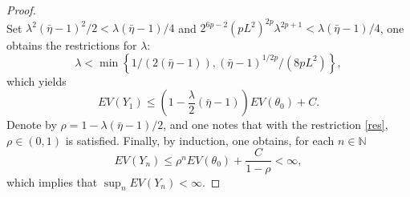 \documentclass[a4paper]{article}
\begin{document}
\begin{proof}
\[\]
Set $\lambda^2(\bar{\eta} -1)^2/2<\lambda (\bar{\eta} -1)/4$ and $2^{6p-2}( pL^2)^{2p}\lambda^{2p+1} <\lambda (\bar{\eta} -1)/4$, one obtains the restrictions for $\lambda$:
\begin{equation}\label{res}
\lambda < \min\left\{1/(2(\bar{\eta} -1)), (\bar{\eta}-1)^{1/2p}/(8pL^2)\right\},
\end{equation}
which yields
\[
E V(Y_1)  \leq \left(1-\frac{\lambda }{2}(\bar{\eta} -1)\right) E V(\theta_0) + C.
\]
Denote by $\rho = 1-\lambda (\bar{\eta} -1)/2$, and one notes that with the restriction \eqref{res}, $\rho \in (0,1)$ is satisfied. Finally, by induction, one obtains, for each $n \in \mathbb{N}$
\[
E V(Y_n) \leq \rho^n E V(\theta_0) + \frac{C}{1-\rho} <\infty,
\]
which implies that $\sup_n EV(Y_n) < \infty$.
\end{proof}
\end{document}
